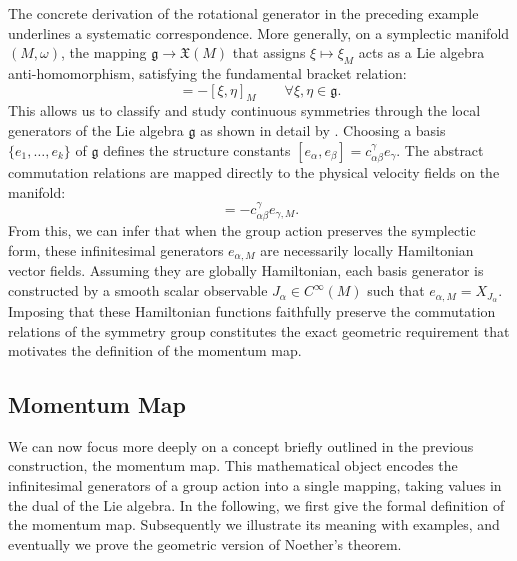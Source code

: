 \medskip

\noindent The concrete derivation of the rotational generator in the preceding example underlines a systematic correspondence. More generally, on a symplectic manifold $(M, \omega)$, the mapping $\mathfrak{g} \to \mathfrak{X}(M)$ that assigns $\xi \mapsto \xi_M$ acts as a Lie algebra anti-homomorphism, satisfying the fundamental bracket relation:
\begin{equation}
	[\xi_M, \eta_M] = -[\xi, \eta]_M \qquad \forall \xi, \eta \in \mathfrak{g}.
\end{equation}
This allows us to classify and study continuous symmetries through the local generators of the Lie algebra $\mathfrak{g}$ as shown in detail by \cite[Construction on p.271]{abrahamFoundationsMechanics2008}. Choosing a basis $\{e_1, \dots, e_k\}$ of $\mathfrak{g}$ defines the structure constants $[e_\alpha, e_\beta] = c_{\alpha\beta}^\gamma e_\gamma$. The abstract commutation relations are mapped directly to the physical velocity fields on the manifold:
\begin{equation}
	[e_{\alpha, M}, e_{\beta, M}] = -c_{\alpha\beta}^\gamma e_{\gamma, M}.
\end{equation}
From this, we can infer that when the group action preserves the symplectic form, these infinitesimal generators $e_{\alpha, M}$ are necessarily locally Hamiltonian vector fields. Assuming they are globally Hamiltonian, each basis generator is constructed by a smooth scalar observable $J_\alpha \in C^\infty(M)$ such that $e_{\alpha, M} = X_{J_\alpha}$. Imposing that these Hamiltonian functions faithfully preserve the commutation relations of the symmetry group constitutes the exact geometric requirement that motivates the definition of the momentum map.

\subsection*{Momentum Map}

We can now focus more deeply on a concept briefly outlined in the previous construction, the momentum map. This mathematical object encodes the infinitesimal generators of a group action into a single mapping, taking values in the dual of the Lie algebra. In the following, we first give the formal definition of the momentum map. Subsequently we illustrate its meaning with examples, and eventually we prove the geometric version of Noether's theorem.


